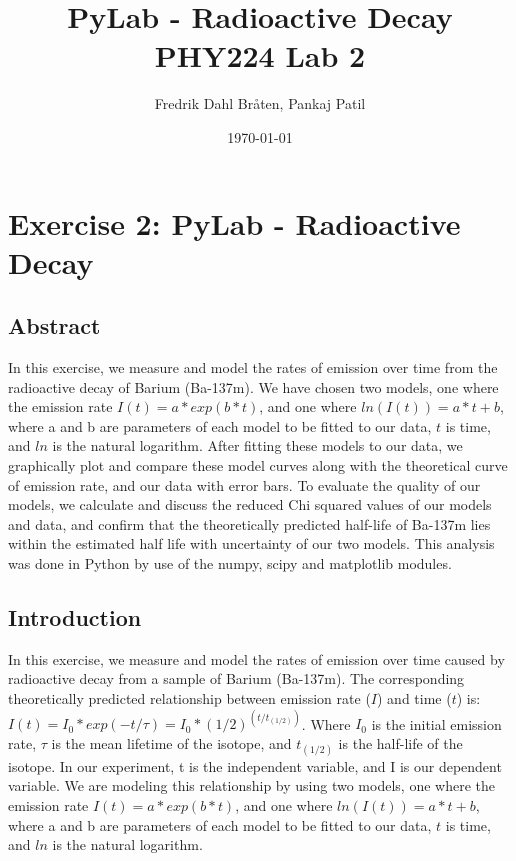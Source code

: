 \documentclass[letterpaper,12pt]{article}
\begin{document}
\title{%
PyLab - Radioactive Decay \\
\large PHY224 Lab 2}
\author{Fredrik Dahl Bråten, Pankaj Patil}
\date{\today}
\maketitle
\tableofcontents
\listoffigures
\listoftables

\pagebreak

\section{Exercise 2:  PyLab - Radioactive Decay}

\subsection{Abstract}

In this exercise, we measure and model the rates of emission over time from the radioactive decay of Barium (Ba-137m). 
We have chosen two models, one where the emission rate $I(t) = a*exp(b*t)$, and one where $ln(I(t)) = a*t+b$, 
where a and b are parameters of each model to be fitted to our data, 
$t$ is time, and $ln$ is the natural logarithm. 
After fitting these models to our data, we graphically plot and 
compare these model curves along with the theoretical curve of emission rate, and our data with error bars. 
To evaluate the quality of our models, we calculate and discuss the reduced Chi squared values of our models and data, 
and confirm that the theoretically predicted half-life of Ba-137m lies within the estimated half life with 
uncertainty of our two models. 
This analysis was done in Python by use of the numpy, scipy and matplotlib modules.

\subsection{Introduction}

In this exercise, we measure and model the rates of emission over time caused 
by radioactive decay from a sample of Barium (Ba-137m). 
The corresponding theoretically predicted relationship between emission 
rate ($I$) and time ($t$) is:
$I(t) = I_0*exp(-t/\tau) = I_0 * (1/2)^(t/t_(1/2))$. 
Where $I_0$ is the initial emission rate, $\tau$ is the mean lifetime of the 
isotope, and $t_(1/2)$ is the half-life of the isotope. 
In our experiment, t is the independent variable, and I is our dependent variable.
We are modeling this relationship by using two models, one where the emission rate 
$I(t) = a*exp(b*t)$, and one where $ln(I(t)) = a*t+b$, 
where a and b are parameters of each model to be fitted to our data, 
$t$ is time, and $ln$ is the natural logarithm.
\end{document}
